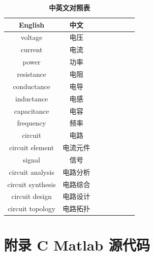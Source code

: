 \documentclass[UTF8]{report}
\theoremstyle{MyLineTheoremStyle} %
\theoremstyle{MyBlockTheoremStyle} %
\theoremstyle{MySubsubsectionStyle} %
\begin{document}
\begin{multicols}{2}
    \begin{table}[H]\centering
        \caption{\textbf{中英文对照表}}
        \begin{tabular}{cccccccc}\toprule
            English & 中文 \\
            \midrule
            voltage            & 电压 \\
            current            & 电流 \\
            power              & 功率 \\
            resistance         & 电阻 \\
            conductance        & 电导 \\
            inductance         & 电感 \\
            capacitance        & 电容 \\
            frequency          & 频率 \\
            circuit            & 电路 \\
            circuit element    & 电流元件 \\
            signal             & 信号 \\
            circuit analysis   & 电路分析 \\
            circuit synthesis  & 电路综合 \\
            circuit design     & 电路设计 \\
            circuit topology   & 电路拓扑 \\
            \bottomrule
        \end{tabular}
    \end{table}
\end{multicols} 


\chapter*{附录 C\hspace*{20pt} Matlab 源代码}   
\thispagestyle{fancy} 
\setcounter{section}{0}   
\renewcommand\thesection{C.\arabic{section}}   
\renewcommand{\thefigure}{C.\arabic{figure}} 
\renewcommand{\thetable}{C.\arabic{table}}

\end{document}
